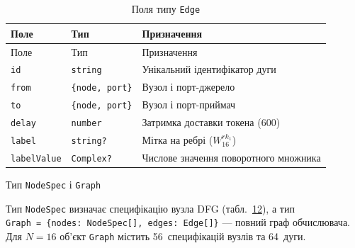 \begin{longtable}[]{@{}
  >{\raggedright\arraybackslash}p{}
  >{\raggedright\arraybackslash}p{}
  >{\raggedright\arraybackslash}p{}@{}}
\caption{\protect{}\label{tab:edge}{}Поля типу
\protect\texttt{Edge}}\tabularnewline
\toprule\noalign{}
\begin{minipage}[b]{\linewidth}\raggedright
Поле
\end{minipage} & \begin{minipage}[b]{\linewidth}\raggedright
Тип
\end{minipage} & \begin{minipage}[b]{\linewidth}\raggedright
Призначення
\end{minipage} \\
\midrule\noalign{}
\endfirsthead
\toprule\noalign{}
\begin{minipage}[b]{\linewidth}\raggedright
Поле
\end{minipage} & \begin{minipage}[b]{\linewidth}\raggedright
Тип
\end{minipage} & \begin{minipage}[b]{\linewidth}\raggedright
Призначення
\end{minipage} \\
\midrule\noalign{}
\endhead
\bottomrule\noalign{}
\endlastfoot
\texttt{id} & \texttt{string} & Унікальний ідентифікатор дуги \\
\texttt{from} & \texttt{\{node,\ port\}} & Вузол і порт-джерело \\
\texttt{to} & \texttt{\{node,\ port\}} & Вузол і порт-приймач \\
\texttt{delay} & \texttt{number} & Затримка доставки токена (600) \\
\texttt{label} & \texttt{string?} & Мітка на ребрі
(\(W_{16}^{rk_{1}}\)) \\
\texttt{labelValue} & \texttt{Complex?} & Числове значення поворотного
множника \\
\end{longtable}

Тип \texttt{NodeSpec} і \texttt{Graph}

Тип \texttt{NodeSpec} визначає специфікацію вузла DFG
(табл.~\hyperref[tab:nodespec]{12}), а тип
\texttt{Graph\ =\ \{nodes:\ NodeSpec{[}{]},\ edges:\ Edge{[}{]}\}} ---
повний граф обчислювача. Для \(N = 16\) об'єкт \texttt{Graph} містить
56~специфікацій вузлів та 64~дуги.

